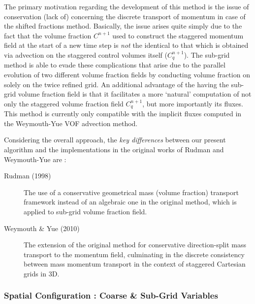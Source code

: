 The primary motivation regarding the development of this 
method is the issue of conservation (lack of) concerning 
the discrete transport of momentum in case of the shifted fractions method.     
Basically, the issue arises quite simply due to the fact that the volume fraction 
$C^{n+1}$ used to construct the staggered momentum field at the start of a 
new time step is \textit{not} the identical to that which is obtained 
via advection on the staggered control volumes itself ($C_{q}^{n+1}$). 
The sub-grid method is able to evade these complications that arise due to
the parallel evolution of two different volume fraction fields by conducting 
volume fraction on solely on the twice refined grid.  
An additional advantage of the having the sub-grid volume fraction field is that 
it facilitates a more `natural' computation of not only the staggered 
volume fraction field $C^{n+1}_q$, but more importantly its fluxes. 
This method is currently only compatible with the implicit fluxes 
computed in the Weymouth-Yue VOF advection method. 

Considering the overall approach, the \textit{key differences} between our 
present algorithm and the implementations in the 
original works of Rudman and Weymouth-Yue are : 

\begin{description}
	\item[Rudman (1998)\cite{rudman1998volume} ] The use of a conservative geometrical 
		mass (volume fraction) transport framework instead of an algebraic one in 
		the original method, which is applied to sub-grid volume fraction field.  
	\item[Weymouth \& Yue (2010) \cite{wy}] The extension of the 
		original method for conservative direction-split mass transport to the momentum field, 
		culminating in the discrete consistency between mass 
		momentum transport in the context of staggered Cartesian grids in 3D. 
\end{description}


\subsubsection*{Spatial Configuration : Coarse \& Sub-Grid Variables}

